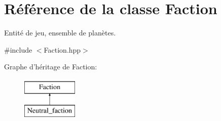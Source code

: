 \hypertarget{classFaction}{\section{Référence de la classe Faction}
\label{classFaction}
}


Entité de jeu, ensemble de planètes.  




{\ttfamily \#include $<$Faction.\-hpp$>$}

Graphe d'héritage de Faction\-:\begin{figure}[H]
\begin{center}
\leavevmode
\includegraphics[height=2.000000cm]{classFaction}
\end{center}
\end{figure}
